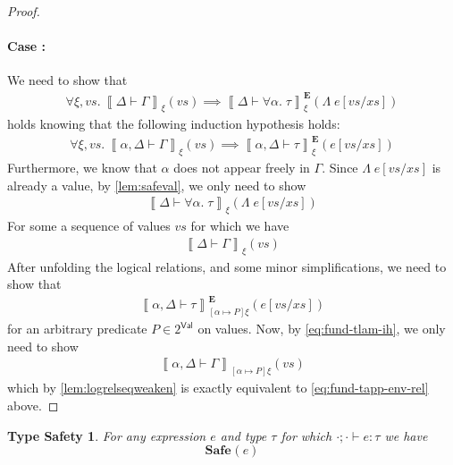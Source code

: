 \documentclass{article}
\newcommand{\VAL}{\mathsf{Val}}
\newcommand{\pred}{P}
\newcommand{\semtyp}[3]{\left\llbracket #2 \vdash #3 \right\rrbracket_{#1}}
\newcommand{\semErel}[1]{#1^{\textbf{E}}}
\newcommand{\semenv}{\xi}
\newcommand{\TLam}{\Lambda}
\newcommand{\Tctx}{\Gamma}
\newcommand{\CtxTps}{\Delta}
\newcommand{\expr}{e}
\newcommand{\typ}{\tau}
\newcommand{\TForall}{\forall}
\newcommand{\tvar}{\alpha}
\newcommand{\typed}[4]{#1; #2 \vdash #3 : #4}
\newcommand{\Safe}[1]{\textbf{Safe}_{#1}}
\begin{document}
\begin{proof}
\paragraph{Case :}
We need to show that
\begin{align}
  \label{eq:fund-tlam-main}
  \forall \semenv, \mathit{vs}.~\semtyp{\semenv}{\CtxTps}{\Tctx}(\mathit{vs}) \implies
  \semErel{\semtyp{\semenv}{\CtxTps}{\TForall \tvar.\; \typ}}(\TLam\; \expr[\mathit{vs}/\mathit{xs}])
\end{align}
holds knowing that the following induction hypothesis holds:
\begin{align}
  \label{eq:fund-tlam-ih}
  \forall \semenv, \mathit{vs}.~\semtyp{\semenv}{\tvar, \CtxTps}{\Tctx}(\mathit{vs}) \implies \semErel{\semtyp{\semenv}{\tvar, \CtxTps}{\typ}}(\expr[\mathit{vs}/\mathit{xs}])
\end{align}
Furthermore, we know that $\tvar$ does not appear freely in $\Tctx$.
Since $\TLam\; \expr[\mathit{vs}/\mathit{xs}]$ is already a value, by \ref{lem:safeval}, we only need to show
\begin{align}
  \label{eq:fund-to-show-1}
  \semtyp{\semenv}{\CtxTps}{\TForall \tvar.\; \typ}(\TLam\; \expr[\mathit{vs}/\mathit{xs}])
\end{align}
For some a sequence of values $\mathit{vs}$ for which we have
\begin{align}
  \label{eq:fund-tapp-env-rel}
  \semtyp{\semenv}{\CtxTps}{\Tctx}(\mathit{vs})
\end{align}
After unfolding the logical relations, and some minor simplifications, we need to show that
\begin{align}
  \label{eq:fund-lam-to-show-2}
  \semErel{\semtyp{[\tvar \mapsto P]\semenv}{\tvar, \CtxTps}{\typ}}(\expr[\mathit{vs}/\mathit{xs}])
\end{align}
for an arbitrary predicate $\pred \in 2^{\VAL}$ on values.
Now, by \eqref{eq:fund-tlam-ih}, we only need to show
\begin{align}
  \label{eq:fund-tapp-to-show-3}
  \semtyp{[\tvar \mapsto \pred]\semenv}{\tvar, \CtxTps}{\Tctx}(\mathit{vs})
\end{align}
which by  \ref{lem:logrelseqweaken} is exactly equivalent to \eqref{eq:fund-tapp-env-rel} above.
\end{proof}

\newtheorem*{typesafety}{Type Safety}

\begin{typesafety}
  \makeatletter{}\makeatother
  \label{thm:typesafety}
  For any expression $\expr$ and type $\typ$ for which $\typed{\cdot}{\cdot}{\expr}{\typ}$ we have
  \[ \Safe{}(\expr) \]
\end{typesafety}
\end{document}

